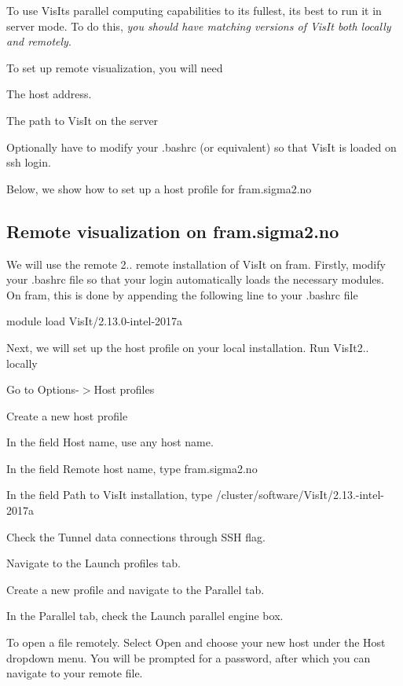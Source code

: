 To use Vis\+It\textquotesingle{}s parallel computing capabilities to its fullest, its best to run it in server mode. To do this, {\itshape you should have matching versions of Vis\+It both locally and remotely}.

To set up remote visualization, you will need


\begin{DoxyEnumerate}
\item The host address.
\item The path to Vis\+It on the server
\item Optionally have to modify your .bashrc (or equivalent) so that Vis\+It is loaded on ssh login.
\end{DoxyEnumerate}

Below, we show how to set up a host profile for fram.\+sigma2.\+no

\subsection*{Remote visualization on fram.\+sigma2.\+no }

We will use the remote 2.. remote installation of Vis\+It on fram. Firstly, modify your .bashrc file so that your login automatically loads the necessary modules. On fram, this is done by appending the following line to your .bashrc file \begin{DoxyVerb}  module load VisIt/2.13.0-intel-2017a
\end{DoxyVerb}


Next, we will set up the host profile on your local installation. Run Vis\+It2.. locally


\begin{DoxyEnumerate}
\item Go to Options-\/$>$Host profiles
\item Create a new host profile
\item In the field \textquotesingle{}Host name\textquotesingle{}, use any host name.
\item In the field \textquotesingle{}Remote host name\textquotesingle{}, type \textquotesingle{}fram.\+sigma2.\+no\textquotesingle{}
\item In the field \textquotesingle{}Path to Vis\+It installation\textquotesingle{}, type \textquotesingle{}/cluster/software/\+Vis\+It/2.13.-\/intel-\/2017a\textquotesingle{}
\item Check the \textquotesingle{}Tunnel data connections through S\+SH\textquotesingle{} flag.
\item Navigate to the \textquotesingle{}Launch profiles\textquotesingle{} tab.
\item Create a new profile and navigate to the \textquotesingle{}Parallel\textquotesingle{} tab.
\item In the \textquotesingle{}Parallel\textquotesingle{} tab, check the \textquotesingle{}Launch parallel engine\textquotesingle{} box.
\end{DoxyEnumerate}

To open a file remotely. Select \textquotesingle{}Open\textquotesingle{} and choose your new host under the \textquotesingle{}Host\textquotesingle{} dropdown menu. You will be prompted for a password, after which you can navigate to your remote file. 